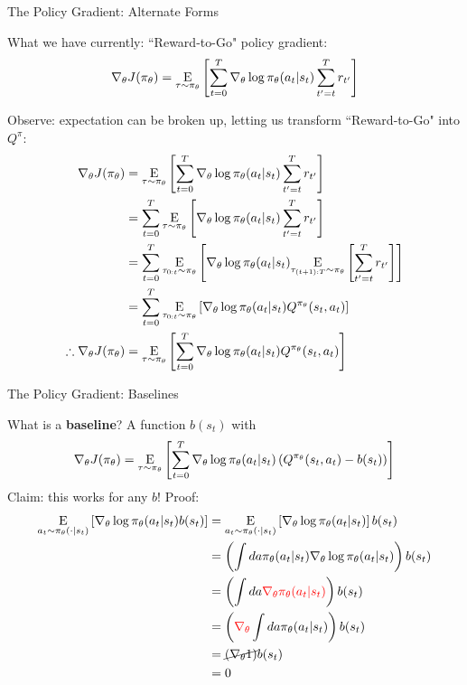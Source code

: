 \documentclass[9pt]{beamer}
\newcommand{\underE}[2]{\underset{\begin{subarray}{c}#1 \end{subarray}}{\E}\left[ #2 \right]}
\begin{document}
\begin{frame}{The Policy Gradient: Alternate Forms}

What we have currently: ``Reward-to-Go" policy gradient:
%
\begin{equation*}
\nabla_{\theta} J(\pi_{\theta}) = \underE{\tau \sim \pi_{\theta}}{\sum_{t=0}^T \nabla_{\theta} \log \pi_{\theta}(a_t | s_t) \sum_{t'=t}^T r_{t'}} 
\end{equation*}

Observe: expectation can be broken up, letting us transform ``Reward-to-Go" into $Q^{\pi}$:
%
\begin{align*}
\nabla_{\theta} J(\pi_{\theta}) &= \underE{\tau \sim \pi_{\theta}}{\sum_{t=0}^T \nabla_{\theta} \log \pi_{\theta}(a_t | s_t) \sum_{t'=t}^T r_{t'}} \\
&= \sum_{t=0}^T \underE{\tau \sim \pi_{\theta}}{\nabla_{\theta} \log \pi_{\theta}(a_t | s_t) \sum_{t'=t}^T r_{t'}} \\
&= \sum_{t=0}^T \underE{\tau_{0:t} \sim \pi_{\theta}}{\nabla_{\theta} \log \pi_{\theta}(a_t | s_t) \underE{\tau_{(t+1):T} \sim \pi_{\theta}}{\sum_{t'=t}^T r_{t'}}} \\
&= \sum_{t=0}^T \underE{\tau_{0:t} \sim \pi_{\theta}}{\nabla_{\theta} \log \pi_{\theta}(a_t | s_t) Q^{\pi_{\theta}}(s_t, a_t)} \\
\therefore \nabla_{\theta} J(\pi_{\theta}) &=\underE{\tau \sim \pi_{\theta}}{\sum_{t=0}^T \nabla_{\theta} \log \pi_{\theta}(a_t | s_t) Q^{\pi_{\theta}}(s_t, a_t)}
\end{align*}

\end{frame}

\begin{frame}{The Policy Gradient: Baselines}

What is a \textbf{baseline}? A function $b(s_t)$ with
%
\begin{equation*}
\nabla_{\theta} J(\pi_{\theta}) =\underE{\tau \sim \pi_{\theta}}{\sum_{t=0}^T \nabla_{\theta} \log \pi_{\theta}(a_t | s_t) \left(Q^{\pi_{\theta}}(s_t, a_t) - b(s_t)\right)}
\end{equation*}
%
Claim: this works for any $b$! Proof:
%
\begin{align*}
\underE{a_t \sim \pi_{\theta}(\cdot|s_t)}{\nabla_{\theta} \log \pi_{\theta}(a_t | s_t) b(s_t)} &= \underE{a_t \sim \pi_{\theta}(\cdot|s_t)}{\nabla_{\theta} \log \pi_{\theta}(a_t | s_t)} b(s_t) \\
&= \left(\int da \pi_{\theta}(a_t|s_t) \nabla_{\theta} \log \pi_{\theta}(a_t|s_t)\right) b(s_t) \\
&=  \left(\int da {\color{red} \nabla_{\theta} \pi_{\theta}(a_t|s_t) }\right) b(s_t) \\
&= \left({\color{red} \nabla_{\theta}}\int da \pi_{\theta}(a_t|s_t) \right) b(s_t) \\
&=\cancel{\left(\nabla_{\theta} 1 \right)} b(s_t) \\
&= 0
\end{align*}

\end{frame}
\end{document}
